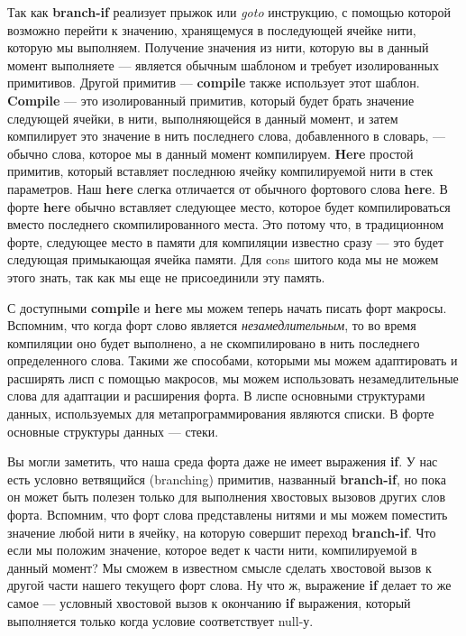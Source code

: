 Так как \textbf{branch-if} реализует прыжок или \emph{goto} инструкцию, с помощью которой возможно перейти к значению, хранящемуся в последующей ячейке нити, которую мы выполняем. Получение значения из нити, которую вы в данный момент выполняете --- является обычным шаблоном и требует изолированных примитивов. Другой примитив --- \textbf{compile} также использует этот шаблон. \textbf{Compile} --- это изолированный примитив, который будет брать значение следующей ячейки, в нити, выполняющейся в данный момент, и затем компилирует это значение в нить последнего слова, добавленного в словарь, --- обычно слова, которое мы в данный момент компилируем. \textbf{Here} простой примитив, который вставляет последнюю ячейку компилируемой нити в стек параметров. Наш \textbf{here} слегка отличается от обычного фортового слова \textbf{here}. В форте \textbf{here} обычно вставляет следующее место, которое будет компилироваться вместо последнего скомпилированного места. Это потому что, в традиционном форте, следующее место в памяти для компиляции известно сразу --- это будет следующая примыкающая ячейка памяти. Для cons шитого кода мы не можем этого знать, так как мы еще не присоединили эту память.

С доступными \textbf{compile} и \textbf{here} мы можем теперь начать писать форт макросы. Вспомним, что когда форт слово является \emph{незамедлительным}, то во время компиляции оно будет выполнено, а не скомпилировано в нить последнего определенного слова. Такими же способами, которыми мы можем адаптировать и расширять лисп с помощью макросов, мы можем использовать незамедлительные слова для адаптации и расширения форта. В лиспе основными структурами данных, используемых для метапрограммирования являются списки. В форте основные структуры данных --- стеки.

Вы могли заметить, что наша среда форта даже не имеет выражения \textbf{if}. У нас есть условно ветвящийся (branching) примитив, названный \textbf{branch-if}, но пока он может быть полезен только для выполнения хвостовых вызовов других слов форта. Вспомним, что форт слова представлены нитями и мы можем поместить значение любой нити в ячейку, на которую совершит переход \textbf{branch-if}. Что если мы положим значение, которое ведет к части нити, компилируемой в данный момент? Мы сможем в известном смысле сделать хвостовой вызов к другой части нашего текущего форт слова. Ну что ж, выражение \textbf{if} делает то же самое --- условный хвостовой вызов к окончанию \textbf{if} выражения, который выполняется только когда условие соответствует null-у.

